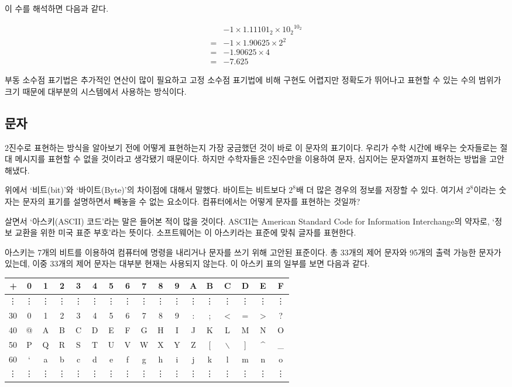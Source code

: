 \documentclass{article}
\begin{document}
이 수를 해석하면 다음과 같다.

$$
\begin{aligned}
     & -1 \times 1.11101_2 \times {10_2}^{10_2} \\
    =& -1 \times 1.90625 \times 2^2 \\
    =& -1.90625 \times 4 \\
    =& -7.625
\end{aligned}
$$

부동 소수점 표기법은 추가적인 연산이 많이 필요하고 고정 소수점 표기법에 비해 구현도 어렵지만
정확도가 뛰어나고 표현할 수 있는 수의 범위가 크기 때문에
대부분의 시스템에서 사용하는 방식이다.

\subsection{문자}

2진수로 표현하는 방식을 알아보기 전에 어떻게 표현하는지 가장 궁금했던 것이 바로 이 문자의
표기이다. 우리가 수학 시간에 배우는 숫자들로는 절대 메시지를 표현할 수 없을 것이라고 생각됐기
때문이다. 하지만 수학자들은 2진수만을 이용하여 문자, 심지어는 문자열까지 표현하는 방법을
고안해냈다.

위에서 `비트(bit)'와 `바이트(Byte)'의 차이점에 대해서 말했다. 바이트는 비트보다 $2^8$배 더
많은 경우의 정보를 저장할 수 있다. 여기서 $2^8$이라는 숫자는 문자의 표기를 설명하면서 빼놓을
수 없는 요소이다. 컴퓨터에서는 어떻게 문자를 표현하는 것일까?

살면서 `아스키(ASCII) 코드'라는 말은 들어본 적이 많을 것이다. ASCII는 American Standard
Code for Information Interchange의 약자로, `정보 교환을 위한 미국 표준 부호'라는 뜻이다.
소프트웨어는 이 아스키라는 표준에 맞춰 글자를 표현한다.

아스키는 7개의 비트를 이용하여 컴퓨터에 명령을 내리거나 문자를 쓰기 위해 고안된 표준이다.
총 33개의 제어 문자와 95개의 출력 가능한 문자가 있는데, 이중 33개의 제어 문자는 대부분 현재는
사용되지 않는다. 이 아스키 표의 일부를 보면 다음과 같다.

\begin{center}
    \begin{tabular}{r|cccccccccccccccc}
        + & 0 & 1 & 2 & 3 & 4 & 5 & 6 & 7 & 8 & 9 & A & B & C & D & E & F \\
        \hline
        \vdots & \vdots & \vdots & \vdots & \vdots & \vdots & \vdots & \vdots & \vdots & \vdots & \vdots & \vdots & \vdots & \vdots & \vdots & \vdots & \vdots \\
        30 & 0 & 1 & 2 & 3 & 4 & 5 & 6 & 7 & 8 & 9 & : & ; & $<$ & = & $>$ & ? \\
        40 & @ & A & B & C & D & E & F & G & H & I & J & K & L & M & N & O \\
        50 & P & Q & R & S & T & U & V & W & X & Y & Z & [ & $\backslash$ & ] & \^{} & \_{} \\
        60 & ` & a & b & c & d & e & f & g & h & i & j & k & l & m & n & o \\
        \vdots & \vdots & \vdots & \vdots & \vdots & \vdots & \vdots & \vdots & \vdots & \vdots & \vdots & \vdots & \vdots & \vdots & \vdots & \vdots & \vdots
    \end{tabular}
\end{center}
\end{document}
